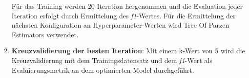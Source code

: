 \begin{enumerate}
    Für das Training werden 20 Iteration hergenommen und die Evaluation jeder Iteration erfolgt durch Ermittelung des \textit{f1}-Wertes. Für die Ermittelung der nächsten Konfiguration an Hyperparameter-Werten wird Tree Of Parzen Estimators verwendet.
    \item \textbf{Kreuzvalidierung der besten Iteration}: Mit einem k-Wert von 5 wird die Kreuzvalidierung mit dem Trainingsdatensatz und dem \textit{f1}-Wert als Evaluierungsmetrik an dem optimierten Model durchgeführt.
\end{enumerate}